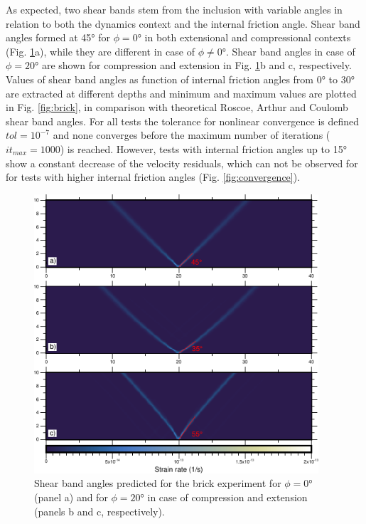\documentclass[hidelinks,10pt,a4paper]{article}
\begin{document}
As expected, two shear bands stem from the inclusion with variable angles in relation to both the dynamics context and the internal friction angle. Shear band
angles formed at 45° for $\phi=0$° in both extensional and compressional contexts (Fig. \ref{fig:brick_beam}a), while they are different in case of $\phi\neq0$°.
Shear band angles in case of $\phi=20$° are shown for compression and extension in Fig. \ref{fig:brick_beam}b  and c, respectively. Values of shear band angles
as function of internal friction angles from 0° to 30° are extracted at different depths and minimum and maximum values are plotted in Fig. \ref{fig:brick},
in comparison with theoretical Roscoe, Arthur and Coulomb shear band angles. For all tests the tolerance for nonlinear convergence is defined $tol=10^{-7}$
and none converges before the maximum number of iterations ($it_{max}=1000$) is reached. However, tests with internal friction angles up to 15° show a constant
decrease of the velocity residuals, which can not be observed for for tests with higher internal friction angles (Fig. \ref{fig:convergence}).

\begin{figure}
\centering
\noindent\includegraphics[width=400px]{./Figures/Brick_Beam.pdf}
\caption{Shear band angles predicted for the brick experiment for $\phi=0$° (panel a) and for $\phi=20$° in case of compression and extension (panels b and c,
respectively).}
\label{fig:brick_beam}
\end{figure}
\end{document}
